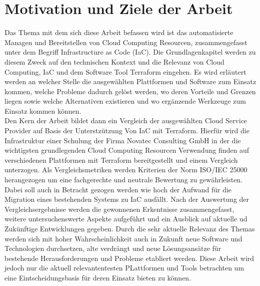 \section{Motivation und Ziele der Arbeit}
Das Thema mit dem sich diese Arbeit befassen wird ist das automatisierte
Managen und Bereitstellen von Cloud Computing Resourcen,
zusammengefasst unter dem Begriff Infrastructure as Code (IaC). Die Grundlagenkapitel werden zu diesem Zweck auf
den technischen Kontext und die Relevanz von Cloud Computing, IaC und
dem Software Tool Terraform eingehen.
Es wird erläutert werden an welcher Stelle die ausgewählten Plattformen
und Software zum Einsatz kommen, welche Probleme dadurch gelöst werden,
wo deren Vorteile und Grenzen liegen sowie welche Alternativen existieren
und wo ergänzende Werkzeuge zum Einsatz kommen können.\\
Den Kern der Arbeit bildet dann ein Vergleich der ausgewählten Cloud
Service Provider auf Basis der Unterstzützung Von IaC mit Terraform.
Hierfür wird die Infrastruktur einer Schulung der Firma Novatec
Consulting GmbH in der die wichtigsten grundlegenden Cloud Computing
Resourcen Verwendung finden auf verschiedenen Plattformen mit Terraform
bereitgestellt und einem Vergleich unterzogen.
Als Vergleichsmetriken werden Kriterien der Norm ISO/IEC 25000
herangezogen um eine fachgerechte und neutrale Bewertung zu gewährleisten.
Dabei soll auch in Betracht gezogen werden wie hoch der Aufwand für die
Migration eines bestehenden Systems zu IaC ausfällt.
Nach der Auswertung der Vergleichsergebnisse werden die gewonnenen
Erkentnisse zusammengefasst, weitere untersuchenswerte Aspekte aufgeführt
und ein Ausblick auf aktuelle ud Zukünftige Entwicklungen gegeben. Durch
die sehr aktuelle Relevanz des Themas werden sich mit hoher
Wahrscheinlichkeit auch
in Zukunft neue Software und Technologien durchsetzen, alte verdrängt und
neue Lösungsansätze für bestehende Herausforderungen und Probleme
etabliert werden. Diese Arbeit wird jedoch nur die aktuell relevantentesten
PLattformen und Tools betrachten um eine Eintscheidungsbasis für deren
Einsatz bieten zu können.
